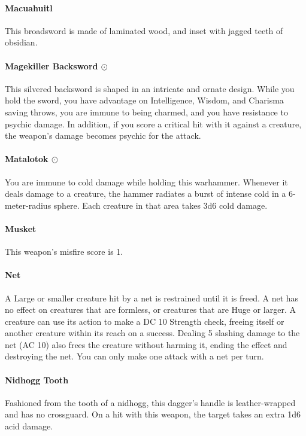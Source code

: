     \paragraph{Macuahuitl}
        This broadsword is made of laminated wood, and inset with jagged teeth of obsidian.
    \paragraph{Magekiller Backsword $\odot$}
        This silvered backsword is shaped in an intricate and ornate design.
        While you hold the sword, you have advantage on Intelligence, Wisdom, and Charisma saving throws, you are immune to being charmed, and you have resistance to psychic damage.
        In addition, if you score a critical hit with it against a creature, the weapon's damage becomes psychic for the attack.
    \paragraph{Matalotok $\odot$}
        You are immune to cold damage while holding this warhammer.
        Whenever it deals damage to a creature, the hammer radiates a burst of intense cold in a 6-meter-radius sphere.
        Each creature in that area takes 3d6 cold damage.
    \paragraph{Musket}
        This weapon's misfire score is 1.
    \paragraph{Net}
        A Large or smaller creature hit by a net is restrained until it is freed.
        A net has no effect on creatures that are formless, or creatures that are Huge or larger.
        A creature can use its action to make a DC 10 Strength check, freeing itself or another creature within its reach on a success.
        Dealing 5 slashing damage to the net (AC 10) also frees the creature without harming it, ending the effect and destroying the net.
        You can only make one attack with a net per turn.
    \paragraph{Nidhogg Tooth}
        Fashioned from the tooth of a nidhogg, this dagger's handle is leather-wrapped and has no crossguard.
        On a hit with this weapon, the target takes an extra 1d6 acid damage.

